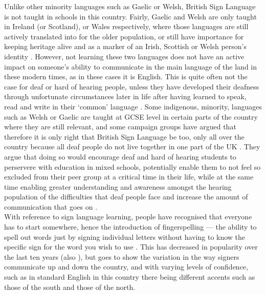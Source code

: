 \documentclass[12pt]{article}
\begin{document}
Unlike other minority languages such as Gaelic or Welsh, British Sign
Language is not taught in schools in this country. Fairly, Gaelic and
Welsh are only taught in Ireland (or Scotland), or Wales respectively,
where those languages are still actively translated into for the older
population, or still have importance for keeping heritage alive and as
a marker of an Irish, Scottish or Welsh person's identity
\citep{welsh-language-identity}. However, not learning these two
languages does not have an active impact on someone's ability to
communicate in the main language of the land in these modern times, as
in these cases it is English. This is quite often not the case for
deaf or hard of hearing people, unless they have developed their
deafness through unfortunate circumstances later in life after having
learned to speak, read and write in their `common' language
\citep{deaf-writing}. Some indigenous, minority, languages such as
Welsh or Gaelic are taught at GCSE level in certain parts of the
country where they are still relevant, and some campaign groups have
argued that therefore it is only right that British Sign Language be
too, only all over the country because all deaf people do not live
together in one part of the UK \citep{campaign-bsl-gcse}. They argue
that doing so would encourage deaf and hard of hearing students to
perservere with education in mixed schools, potentially enable them to
not feel so excluded from their peer group at a critical time in their
life, while at the same time enabling greater understanding and
awareness amongst the hearing population of the difficulties that deaf
people face and increase the amount of communication that goes on
\citep{campaign-bsl-gcse-bbc}.\\

With reference to sign language learning, people have recognised that
everyone has to start somewhere, hence the introduction of
fingerspelling --- the ability to spell out words just by signing
individual letters without having to know the specific sign for the
word you wish to use \citep{fingerspelling}. This has decreased in
popularity over the last ten years (also \cite{fingerspelling}), but
goes to show the variation in the way signers communicate up and down
the country, and with varying levels of confidence, such as in
standard English in this country there being different accents such as
those of the south and those of the north.\\
\end{document}
